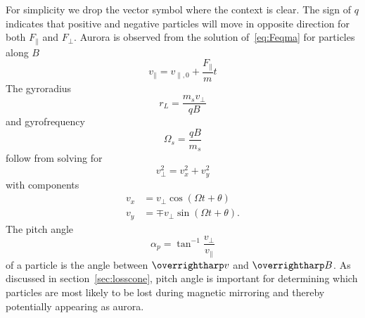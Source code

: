 For simplicity we drop the vector symbol where the context is clear.
The sign of $q$ indicates that positive and negative particles will move in opposite direction for both $F_\parallel$ and $F_\perp$. 
Aurora is observed \citep{borovsky1993} from the solution of~\eqref{eq:Feqma} for particles along $B$
\begin{equation}\label{eq:vpar}
v_\parallel = v_{\parallel,0} + \frac{F_\parallel}{m}t
\end{equation}
The gyroradius
\begin{equation}\label{eq:gyrad}
r_L = \frac{m_s v_\perp}{qB}
\end{equation}
and gyrofrequency
\begin{equation}\label{eq:gyfreq}
\Omega_s = \frac{q B}{m_s}
\end{equation}
follow from solving for 
\begin{equation}\label{eq:vperp}
v_\perp^2 = v_x^2 + v_y^2 
\end{equation}
with components
\begin{align}
v_x &= v_\perp \cos{\left( \Omega t + \theta \right)} \label{eq:vxy} \\
v_y &= \mp v_\perp \sin{\left( \Omega t + \theta \right)} \nonumber.
\end{align}
The pitch angle
\begin{equation}\label{eq:pitch}
\alpha_p = \tan^{-1}{\frac{v_\perp}{v_\parallel}}
\end{equation}
of a particle is the angle between $\vect{v}$ and $\vect{B}$.
As discussed in section~\ref{sec:losscone}, pitch angle is important for determining which particles are most likely to be lost during magnetic mirroring and thereby potentially appearing as aurora.